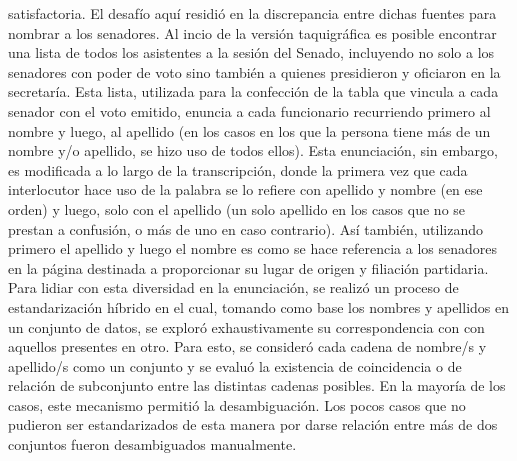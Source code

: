 satisfactoria. El desaf\'io aqu\'i residi\'o en la discrepancia entre
dichas fuentes para nombrar a los senadores. Al incio de la versi\'on taquigr\'afica
es posible encontrar una lista de todos los asistentes a la sesi\'on del Senado,
incluyendo no solo a los senadores con poder de voto sino tambi\'en a quienes presidieron
y oficiaron en la secretar\'ia. Esta lista, utilizada para la confecci\'on
de la tabla que vincula a cada senador con el voto emitido, enuncia a cada funcionario
recurriendo primero al nombre y luego, al apellido (en los casos en los que
la persona tiene m\'as de un nombre y/o apellido, se hizo uso de todos ellos). Esta
enunciaci\'on, sin embargo, es modificada a lo largo de la transcripci\'on, donde la
primera vez que cada interlocutor hace uso de la palabra se lo refiere con apellido
y nombre (en ese orden) y luego, solo con el apellido (un solo apellido en los casos que no
se prestan a confusi\'on, o m\'as de uno en caso contrario). As\'i tambi\'en, utilizando primero
el apellido y luego el nombre es como se hace referencia a los senadores en la p\'agina
destinada a proporcionar su lugar de origen y filiaci\'on partidaria. Para lidiar con esta
diversidad en la enunciaci\'on, se realiz\'o un proceso de estandarizaci\'on h\'ibrido en el
cual, tomando como base los nombres y apellidos en un conjunto de datos, se explor\'o
exhaustivamente su correspondencia con con aquellos presentes en otro.
Para esto, se consider\'o cada cadena de nombre/s y apellido/s como un conjunto
y se evalu\'o la existencia de coincidencia
o de relaci\'on de subconjunto entre las distintas cadenas posibles. En la mayor\'ia de los casos,
este mecanismo permiti\'o la desambiguaci\'on. Los pocos casos que no pudieron ser estandarizados
de esta manera por darse relaci\'on entre m\'as de dos conjuntos fueron desambiguados manualmente.